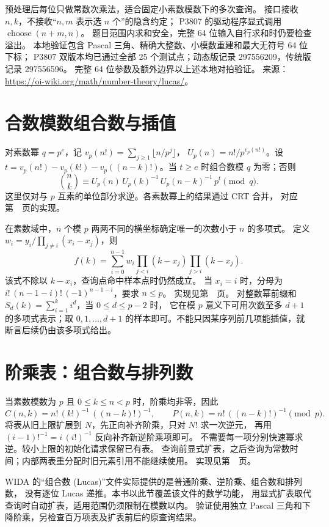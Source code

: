 预处理后每位只做常数次乘法，适合固定小素数模数下的多次查询。
接口接收 $n,k$，不接收“$n,m$ 表示选 $n$ 个”的隐含约定；
P3807 的驱动程序显式调用 $\operatorname{choose}(n+m,n)$。
题目范围内求和安全，完整 64 位输入自行求和时仍要检查溢出。
本地验证包含 Pascal 三角、精确大整数、小模数重建和最大无符号 64 位下标；
P3807 双版本均已通过全部 25 个测试点；动态版记录 297556209，传统版记录 297556596。
完整 64 位参数及额外边界以上述本地对拍验证。
来源：\url{https://oi-wiki.org/math/number-theory/lucas/}。

\section{合数模数组合数与插值}\label{knowledge-exlucas}
对素数幂 $q=p^e$，记 $v_p(n!)=\sum_{j\ge1}\lfloor n/p^j\rfloor$，
$U_p(n)=n!/p^{v_p(n!)}$。设
$t=v_p(n!)-v_p(k!)-v_p((n-k)!)$。当 $t\ge e$ 时组合数模 $q$ 为零；否则
\[
\binom nk\equiv U_p(n)\,U_p(k)^{-1}\,U_p(n-k)^{-1}\,p^t\pmod q.
\]
这里仅对与 $p$ 互素的单位部分求逆。各素数幂上的结果通过 CRT 合并，
对应第~\pageref{compact-ExLucas}~页的实现。

在素数域中，$n$ 个模 $p$ 两两不同的横坐标确定唯一的次数小于 $n$ 的多项式。
定义 $w_i=y_i/\prod_{j\ne i}(x_i-x_j)$，则
\[
f(k)=\sum_{i=0}^{n-1}w_i\prod_{j<i}(k-x_j)\prod_{j>i}(k-x_j).
\]
该式不除以 $k-x_i$，查询点命中样本点时仍然成立。
当 $x_i=i$ 时，分母为 $i!\,(n-1-i)!\,(-1)^{n-1-i}$，要求 $n\le p$。
实现见第~\pageref{compact-Lagrange}~页。
对整数幂前缀和 $S_d(k)=\sum_{i=1}^k i^d$，当 $0\le d\le p-2$ 时，
它在模 $p$ 意义下可用次数至多 $d+1$ 的多项式表示；取 $0,1,\ldots,d+1$
的样本即可。不能只因某序列前几项能插值，就断言后续仍由该多项式给出。

\section{阶乘表：组合数与排列数}\label{knowledge-factorial-table}
当素数模数为 $p$ 且 $0\le k\le n<p$ 时，阶乘均非零，因此
\[
C(n,k)=n!\,(k!)^{-1}\,((n-k)!)^{-1},\qquad
P(n,k)=n!\,((n-k)!)^{-1}\pmod p.
\]
将表从旧上限扩展到 $N$，先正向补齐阶乘，只对 $N!$ 求一次逆元，
再用 $(i-1)!^{-1}=i\,(i!)^{-1}$ 反向补齐新逆阶乘项即可。
不需要每一项分别快速幂求逆。较小上限的初始化请求保留已有表。
查询前显式扩表，之后查询为常数时间；内部两表重分配时旧元素引用不能继续使用。
实现见第~\pageref{compact-Binomial}~页。

WIDA 的“组合数 (Lucas)”文件实际提供的是普通阶乘、逆阶乘、组合数和排列数，
没有逐位 Lucas 递推。本书以此节覆盖该文件的数学功能，
用显式扩表取代查询时自动扩表，适用范围仍须限制在模数以内。
验证使用独立 Pascal 三角和下降阶乘，另检查百万项表及扩表前后的原查询结果。

